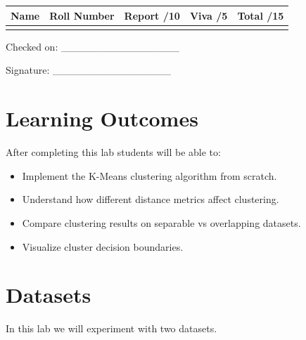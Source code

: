\documentclass[12pt,a4paper]{article}
\begin{document}
\renewcommand{\arraystretch}{2.0}
\begin{tabularx}{\textwidth}{|Y|Y|Y|Y|Y|}
\hline
\textbf{Name} & \textbf{Roll Number} & \textbf{Report /10} & \textbf{Viva /5} & \textbf{Total /15} \\
\hline
 & & & & \\
\hline
\end{tabularx}
\renewcommand{\arraystretch}{1.0}

\vspace{12pt}

\begin{flushright}
Checked on: \_\_\_\_\_\_\_\_\_\_\_\_\_\_\_\_

\vspace{6pt}

Signature: \_\_\_\_\_\_\_\_\_\_\_\_\_\_\_\_
\end{flushright}

\newpage


\section{Learning Outcomes}

After completing this lab students will be able to:

\begin{itemize}
\item Implement the K-Means clustering algorithm from scratch.
\item Understand how different distance metrics affect clustering.
\item Compare clustering results on separable vs overlapping datasets.
\item Visualize cluster decision boundaries.
\end{itemize}


\section{Datasets}

In this lab we will experiment with two datasets.
\end{document}
